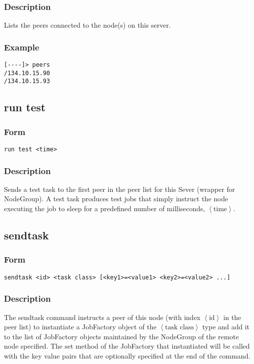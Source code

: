 \documentclass[12pt]{article}
\begin{document}
\subsubsection{Description}
Lists the peers connected to the node(s) on this server.
\subsubsection{Example}
\begin{verbatim}
[----]> peers
/134.10.15.90
/134.10.15.93
\end{verbatim}

\subsection{run test}
\subsubsection{Form}
\begin{verbatim}
run test <time>
\end{verbatim}
\subsubsection{Description}
Sends a test task to the first peer in the peer list for this Sever (wrapper for NodeGroup). A test task produces test jobs that simply instruct the node executing the job to sleep for a predefined number of milliseconds, $\left<\text{time}\right>$.

\subsection{sendtask}
\subsubsection{Form}
\begin{verbatim}
sendtask <id> <task class> [<key1>=<value1> <key2>=<value2> ...]
\end{verbatim}
\subsubsection{Description}
The sendtask command instructs a peer of this node (with index $\left<\text{id}\right>$ in the peer list) to instantiate a JobFactory object of the $\left<\text{task class}\right>$ type and add it to the list of JobFactory objects maintained by the NodeGroup of the remote node specified. The set method of the JobFactory that instantiated will be called with the key value pairs that are optionally specified at the end of the command.
\end{document}
